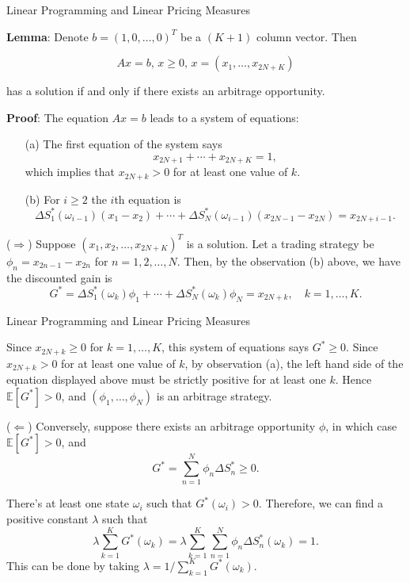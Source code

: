 \documentclass{beamer}
\begin{document}
\begin{frame}{Linear Programming and Linear Pricing Measures}

    {\footnotesize \footnotesize
    
    \par \textbf{Lemma}: Denote $b = (1, 0, \ldots, 0)^T$ be a $(K + 1)$ column vector. Then

    \[
    Ax = b, \, x \geq 0, \, x = (x_1, \ldots, x_{2N+K})
    \]

    has a solution if and only if there exists an arbitrage opportunity.
    \vspace{1em}
    \par  \pause \textbf{Proof}:
    The equation $Ax = b$ leads to a system of equations:

    \begin{enumerate}
    \item[(a)] The first equation of the system says
    \[
    x_{2N+1} + \cdots + x_{2N+K} = 1,
    \]
    which implies that $x_{2N+k} > 0$ for at least one value of $k$.

    \item[(b)] For $i \geq 2$ the $i$th equation is
    \[
    \Delta S_1^*(\omega_{i-1})(x_1 - x_2) + \cdots + \Delta S_N^*(\omega_{i-1})(x_{2N-1} - x_{2N}) = x_{2N+i-1}.
    \]
    \end{enumerate}
    \par \pause  ($\Rightarrow$) Suppose $(x_1, x_2, \ldots, x_{2N+K})^T$ is a solution. Let a trading strategy be $\phi_n = x_{2n-1} - x_{2n}$ for $n = 1, 2, \ldots, N$. Then, by the observation (b) above, we have the discounted gain is
    \[
    G^* = \Delta S_1^*(\omega_k)\phi_1 + \cdots + \Delta S_N^*(\omega_k)\phi_N = x_{2N+k}, \quad k = 1, \ldots, K.
    \]
    }
\end{frame}
\begin{frame}{Linear Programming and Linear Pricing Measures}

    {\footnotesize \footnotesize
    Since $x_{2N+k} \geq 0$ for $k = 1, \ldots, K$, this system of equations says $G^* \geq 0$. Since $x_{2N+k} > 0$ for at least one value of $k$, by observation (a), the left hand side of the equation displayed above must be strictly positive for at least one $k$. Hence $\mathbb{E}[G^*] > 0$, and $(\phi_1, \ldots, \phi_N)$ is an arbitrage strategy.
    \vspace{1em}
    \par   \pause ($\Leftarrow$) Conversely, suppose there exists an arbitrage opportunity $\phi$, in which case $\mathbb{E}[G^*] > 0$, and
\[
G^* = \sum_{n=1}^N \phi_n \Delta S_n^* \geq 0.
\]

There's at least one state $\omega_i$ such that $G^*(\omega_i) > 0$. Therefore, we can find a positive constant $\lambda$ such that
\[
\lambda \sum_{k=1}^K G^*(\omega_k) = \lambda \sum_{k=1}^K \sum_{n=1}^N \phi_n \Delta S_n^*(\omega_k) = 1.
\]
This can be done by taking $\lambda = 1 / \sum_{k=1}^{K} G^*(\omega_k)$.
    }
\end{frame}
\end{document}
